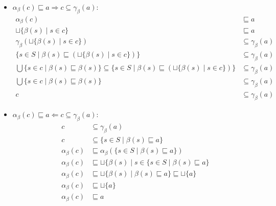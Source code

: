 \begin{itemize}
	\begin{itemize}
		\item $\alpha_\beta(c) \sqsubseteq a \Rightarrow c \subseteq \gamma_\beta(a)$:
		\begin{align*}
			\alpha_\beta(c) & \sqsubseteq a
			\\
			\sqcup \{\beta(s) \mid s \in c\}& \sqsubseteq a
			\\
			\gamma_\beta(\sqcup \{\beta(s) \mid s \in c\}) & \subseteq \gamma_\beta(a)
			\\
			\{s \in S \mid \beta(s) \sqsubseteq (\sqcup \{\beta(s) \mid s \in c\}) \} & \subseteq \gamma_\beta(a)
			\\
			\bigcup \{ s \in c \mid \beta(s) \sqsubseteq \beta(s) \} \subseteq
			\{s \in S \mid \beta(s) \sqsubseteq (\sqcup \{\beta(s) \mid s \in c\}) \} & \subseteq \gamma_\beta(a)
			\\
			\bigcup \{ s \in c \mid \beta(s) \sqsubseteq \beta(s) \} & \subseteq \gamma_\beta(a)
			\\
			c & \subseteq \gamma_\beta(a)
		\end{align*}
		\item $\alpha_\beta(c) \sqsubseteq a \Leftarrow c \subseteq \gamma_\beta(a)$:
		\begin{align*}
			c & \subseteq \gamma_\beta(a) \\
			c & \subseteq \{ s \in S \mid \beta(s) \sqsubseteq a \} \\
			\alpha_\beta(c) & \sqsubseteq \alpha_\beta(\{ s \in S \mid \beta(s) \sqsubseteq a \}) \\
			\alpha_\beta(c) & \sqsubseteq \sqcup \{\beta(s) \mid s \in \{ s \in S \mid \beta(s) \sqsubseteq a \} \\
			\alpha_\beta(c) & \sqsubseteq \sqcup \{\beta(s) \mid \beta(s) \sqsubseteq a\} \sqsubseteq \sqcup \{a\}\\
			\alpha_\beta(c) & \sqsubseteq \sqcup \{a\} \\
			\alpha_\beta(c) & \sqsubseteq a \\
		\end{align*}
	\end{itemize}
\end{itemize}